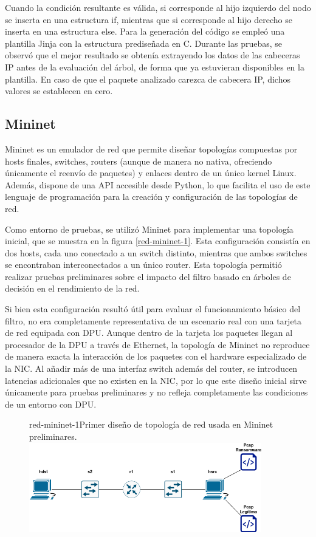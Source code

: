 Cuando la condición resultante es válida, si corresponde al hijo izquierdo del nodo se inserta en una estructura if, mientras que si corresponde al hijo derecho se inserta en una estructura else. Para la generación del código se empleó una plantilla Jinja con la estructura prediseñada en C. Durante las pruebas, se observó que el mejor resultado se obtenía extrayendo los datos de las cabeceras IP antes de la evaluación del árbol, de forma que ya estuvieran disponibles en la plantilla. En caso de que el paquete analizado carezca de cabecera IP, dichos valores se establecen en cero.

\subsection{Mininet}
Mininet es un emulador de red que permite diseñar topologías compuestas por hosts finales, switches, routers (aunque de manera no nativa, ofreciendo únicamente el reenvío de paquetes) y enlaces dentro de un único kernel Linux. Además, dispone de una API accesible desde Python, lo que facilita el uso de este lenguaje de programación para la creación y configuración de las topologías de red\cite{lantz2021mininet}.

Como entorno de pruebas, se utilizó Mininet para implementar una topología inicial, que se muestra en la figura \ref{red-mininet-1}. Esta configuración consistía en dos hosts, cada uno conectado a un switch distinto, mientras que ambos switches se encontraban interconectados a un único router. Esta topología permitió realizar pruebas preliminares sobre el impacto del filtro basado en árboles de decisión en el rendimiento de la red.

Si bien esta configuración resultó útil para evaluar el funcionamiento básico del filtro, no era completamente representativa de un escenario real con una tarjeta de red equipada con DPU. Aunque dentro de la tarjeta los paquetes llegan al procesador de la DPU a través de Ethernet, la topología de Mininet no reproduce de manera exacta la interacción de los paquetes con el hardware especializado de la NIC. Al añadir más de una interfaz switch además del router, se introducen latencias adicionales que no existen en la NIC, por lo que este diseño inicial sirve únicamente para pruebas preliminares y no refleja completamente las condiciones de un entorno con DPU.

\begin{figure}[Primera Topología de Red]{red-mininet-1}{Primer diseño de topología de red usada en Mininet preliminares.}
	\includegraphics[width=0.9\textwidth]{capturas/DiagramaRedArbol1.png}
\end{figure}

